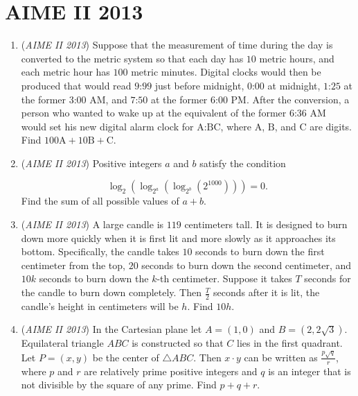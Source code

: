 \section{AIME II 2013}
        \begin{enumerate}
        	\item (\textit{AIME II 2013}) Suppose that the measurement of time during the day is converted to the metric system so that each day has $10$ metric hours, and each metric hour has $100$ metric minutes. Digital clocks would then be produced that would read $\text{9:99}$ just before midnight, $\text{0:00}$ at midnight, $\text{1:25}$ at the former $\text{3:00}$ AM, and $\text{7:50}$ at the former $\text{6:00}$ PM. After the conversion, a person who wanted to wake up at the equivalent of the former $\text{6:36}$ AM would set his new digital alarm clock for $\text{A:BC}$, where $\text{A}$, $\text{B}$, and $\text{C}$ are digits. Find $100\text{A}+10\text{B}+\text{C}$.


 

	\item (\textit{AIME II 2013}) Positive integers $a$ and $b$ satisfy the condition

 \[\log_2(\log_{2^a}(\log_{2^b}(2^{1000}))) = 0.\]
Find the sum of all possible values of $a+b$.


 

	\item (\textit{AIME II 2013}) A large candle is $119$ centimeters tall.  It is designed to burn down more quickly when it is first lit and more slowly as it approaches its bottom.  Specifically, the candle takes $10$ seconds to burn down the first centimeter from the top, $20$ seconds to burn down the second centimeter, and $10k$ seconds to burn down the $k$-th centimeter.  Suppose it takes $T$ seconds for the candle to burn down completely.  Then $\frac{T}{2}$ seconds after it is lit, the candle's height in centimeters will be $h$.  Find $10h$.


 

	\item (\textit{AIME II 2013}) In the Cartesian plane let $A = (1,0)$ and $B = \left( 2, 2\sqrt{3} \right)$.  Equilateral triangle $ABC$ is constructed so that $C$ lies in the first quadrant.  Let $P=(x,y)$ be the center of $\triangle ABC$.  Then $x \cdot y$ can be written as $\frac{p\sqrt{q}}{r}$, where $p$ and $r$ are relatively prime positive integers and $q$ is an integer that is not divisible by the square of any prime.  Find $p+q+r$.



\end{enumerate}
